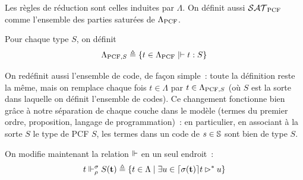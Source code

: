 \documentclass{article}
\begin{document}
\begin{defi}[$\LamP$]
\begin{center}
    \begin{prooftree}
    \end{prooftree}
    \quad
    \begin{prooftree}
    \end{prooftree}
    \quad
    \begin{prooftree}
    \end{prooftree}

    \vspace{0.5cm}
    
    \begin{prooftree}
    \end{prooftree}
    \quad
    \begin{prooftree}
    \end{prooftree}
    \quad
    \begin{prooftree}
    \end{prooftree}
  \end{center}

  Les règles de réduction sont celles induites par $\Lambda$. On définit aussi $\SATP$ comme l'ensemble des parties saturées de $\LamP$.

  Pour chaque type $S$, on définit
  \[\LamS{S}\defeq \{t\in\LamP\mid \vdash t : S\}\]
\end{defi}

On redéfinit aussi l'ensemble de code, de façon simple~: toute la définition reste la même, mais on remplace chaque fois $t\in \Lambda$ par $t\in \LamS{S}$ (où $S$ est la sorte dans laquelle on définit l'ensemble de codes). Ce changement fonctionne bien grâce à notre séparation de chaque couche dans le modèle (termes du premier ordre, proposition, langage de programmation)~: en particulier, en associant à la sorte $S$ le type de PCF $S$, les termes dans un code de $s\in \bS$ sont bien de type $S$.

On modifie maintenant la relation $\reali$ en un seul endroit~:
\[t\reali_\rho^\sigma S(\bt) \defeq \{ t \in \Lambda\mid \exists u \in \ceil{\sigma(\bt)}t\rhd^* u\}\]
\end{document}
